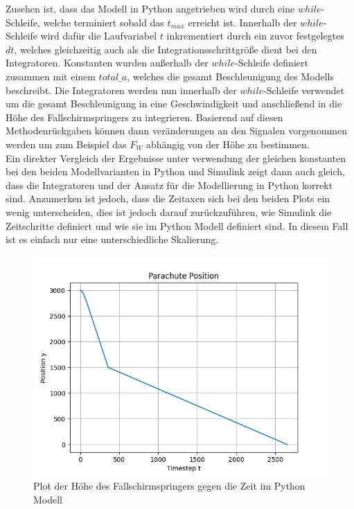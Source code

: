 \documentclass[]{iat}
\begin{document}
Zusehen ist, dass das Modell in Python angetrieben wird durch eine $while$-Schleife, welche terminiert sobald das $t_{max}$ erreicht ist. Innerhalb der $while$-Schleife wird dafür die Laufvariabel $t$ inkrementiert durch ein zuvor festgelegtes $dt$, welches gleichzeitig auch als die Integrationsschrittgröße dient bei den Integratoren. Konstanten wurden außerhalb der $while$-Schleife definiert zusammen mit einem $total\_a$, welches die gesamt Beschleunigung des Modells beschreibt. Die Integratoren werden nun innerhalb der $while$-Schleife verwendet um die gesamt Beschleunigung in eine Geschwindigkeit und anschließend in die Höhe des Fallschirmspringers zu integrieren. Basierend auf diesen Methodenrückgaben können dann veränderungen an den Signalen vorgenommen werden um zum Beispiel das $F_W$ abhängig von der Höhe zu bestimmen.\\
Ein direkter Vergleich der Ergebnisse unter verwendung der gleichen konstanten bei den beiden Modellvarianten in Python und Simulink zeigt dann auch gleich, dass die Integratoren und der Ansatz für die Modellierung in Python korrekt sind. Anzumerken ist jedoch, dass die Zeitaxen sich bei den beiden Plots ein wenig unterscheiden, dies ist jedoch darauf zurückzuführen, wie Simulink die Zeitschritte definiert und wie sie im Python Modell definiert sind. In diesem Fall ist es einfach nur eine unterschiedliche Skalierung.
\begin{figure}[H]
    \includegraphics[width=\textwidth]{graphics/python_parachute_s_plot.png}
    \centering
    \caption{Plot der Höhe des Fallschirmspringers gegen die Zeit im Python Modell}
    \label{fig:python_parachute_s_plot}
\end{figure}
\end{document}
